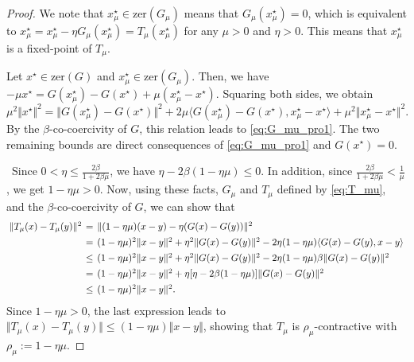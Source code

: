\documentclass{article}
\theoremstyle{plain}
\theoremstyle{definition}
\newcommand{\norms}[1]{\Vert#1\Vert}
\newcommand{\zer}[1]{\mathrm{zer}(#1)}
\newcommand{\iprods}[1]{\langle #1\rangle}
\newcommand{\0}{\boldsymbol{0}}
\begin{document}
\begin{proof}
We note that $x^{\star}_{\mu}\in \zer{G_{\mu}}$ means that $G_{\mu}(x^{\star}_{\mu}) = 0$, which is equivalent to $x^{\star}_{\mu} = x^{\star}_{\mu} - \eta G_{\mu}(x^{\star}_{\mu}) = T_{\mu}(x^{\star}_{\mu})$ for any $\mu > 0$ and $\eta > 0$. This means that $x^{\star}_{\mu}$ is a fixed-point of $T_{\mu}$.

Let $x^{\star} \in \zer{G}$ and $x^{\star}_{\mu} \in \zer{G_{\mu}}$.
Then, we have $-\mu x^{\star} = G(x^{\star}_{\mu} ) - G( x^{\star} ) + \mu(x^{\star}_{\mu} - x^{\star})$.
Squaring both sides, we obtain 
\begin{equation*}
\mu^2\norms{x^{\star}}^2 = \norms{G(x^{\star}_{\mu} ) - G( x^{\star} )}^2 + 2\mu\iprods{G(x^{\star}_{\mu} ) - G( x^{\star} ), x^{\star}_{\mu} - x^{\star}} + \mu^2\norms{x^{\star}_{\mu} - x^{\star}}^2.
\end{equation*}
By the $\beta$-co-coercivity of $G$, this relation leads to \eqref{eq:G_mu_pro1}.
The two remaining bounds are direct consequences of \eqref{eq:G_mu_pro1} and $G(x^{\star}) = 0$.

~Since $0 < \eta \leq \frac{2\beta}{1 + 2\beta\mu}$, we have $\eta - 2\beta(1 - \eta\mu) \leq 0$.
In addition, since $\frac{2\beta}{1 + 2\beta\mu} < \frac{1}{\mu}$, we get $1 - \eta\mu > 0$.
Now, using these facts, $G_{\mu}$ and $T_{\mu}$ defined by \eqref{eq:T_mu}, and the $\beta$-co-coercivity of $G$, we can show that
\begin{equation*}
\arraycolsep=0.2em
\begin{array}{lcl}
    \norms{ T_{\mu} (x) - T_{\mu} (y) }^2 &= &  \norms{ (1-\eta \mu) (x-y) - \eta (G(x) - G(y)) }^2 \vspace{1ex}\\
    &= & (1-\eta \mu )^2 \norms{ x - y }^2 + \eta^2 \norms{ G(x) - G(y) }^2 - 2\eta (1-\eta \mu) \iprods{ G(x) - G(y), x - y } \vspace{1ex} \\    
    &\leq & (1 - \eta \mu )^2 \norms{ x - y }^2 + \eta^2 \norms{ G(x) - G(y) }^2 - 2\eta (1-\eta \mu) \beta \norms{ G(x) - G(y) }^2 \vspace{1ex} \\
    & = & (1 - \eta \mu)^2 \norms{ x - y }^2 + \eta [ \eta - 2\beta (1-\eta \mu ) ] \norms{ G(x) - G(y) }^2 \vspace{1ex}\\
    & \leq & (1 - \eta\mu)^2\norms{x - y}^2.
\end{array}
\end{equation*}
Since $1 - \eta\mu > 0$, the last expression leads to $ \norms{ T_{\mu} (x) - T_{\mu} (y) } \leq (1 - \eta\mu)\norms{x - y}$, showing that $T_{\mu}$ is $\rho_{\mu}$-contractive with $\rho_{\mu} := 1 - \eta\mu$.
\end{proof}
\end{document}
